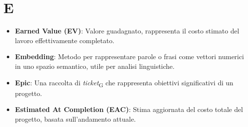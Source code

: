 \section{E}
\begin{itemize}
    \item \textbf{Earned Value (EV)}: Valore guadagnato, rappresenta il costo stimato del lavoro effettivamente completato.
    \item \textbf{Embedding}: Metodo per rappresentare parole o frasi come vettori numerici in uno spazio semantico, utile per analisi linguistiche.
    \item \textbf{Epic}: Una raccolta di \textit{ticket}\textsubscript{G} che rappresenta obiettivi significativi di un progetto.
    \item \textbf{Estimated At Completion (EAC)}: Stima aggiornata del costo totale del progetto, basata sull'andamento attuale.
\end{itemize}
